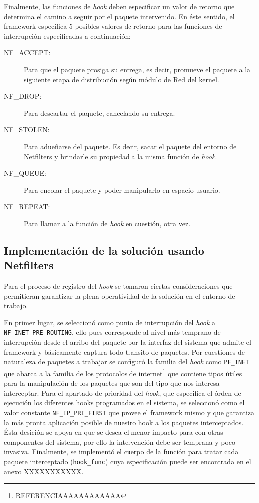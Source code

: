 Finalmente, las funciones de \emph{hook} deben especificar un valor de retorno que determina el camino a seguir por el paquete intervenido. En éste sentido, el framework especifica 5 posibles valores de retorno para las funciones de interrupción especificadas a continuación:
\begin{description}
\item[NF\_ACCEPT:] Para que el paquete prosiga su entrega, es decir, promueve el paquete a la siguiente etapa de distribución según módulo de Red del kernel.
\item[NF\_DROP:] Para descartar el paquete, cancelando su entrega.
\item[NF\_STOLEN:] Para adueñarse del paquete. Es decir, sacar el paquete del entorno de Netfilters y brindarle su propiedad a la misma función de \emph{hook}.
\item[NF\_QUEUE:] Para encolar el paquete y poder manipularlo en espacio usuario.
\item[NF\_REPEAT:] Para llamar a la función de \emph{hook} en cuestión, otra vez.
\end{description}

\subsection{Implementación de la solución usando Netfilters}
Para el proceso de registro del \emph{hook} se tomaron ciertas consideraciones que permitieran garantizar la plena operatividad de la solución en el entorno de trabajo.

En primer lugar, se seleccionó como punto de interrupción del \emph{hook} a \verb=NF_INET_PRE_ROUTING=, ello pues corresponde al nivel más temprano de interrupción desde el arribo del paquete por la interfaz del sistema que admite el framework y básicamente captura todo transito de paquetes. Por cuestiones de naturaleza de paquetes a trabajar se configuró la familia del \emph{hook} como \verb=PF_INET= que abarca a la familia de los protocolos de internet\footnote{REFERENCIAAAAAAAAAAAA} que contiene tipos útiles para la manipulación de los paquetes que son del tipo que nos interesa interceptar. Para el apartado de prioridad del \emph{hook}, que especifica el órden de ejecución los diferentes hooks programados en el sistema, se seleccionó como el valor constante \verb=NF_IP_PRI_FIRST= que provee el framework mismo y que garantiza la más pronta aplicación posible de nuestro hook a los paquetes interceptados. Ésta desición se apoya en que se desea el menor impacto para con otras componentes del sistema, por ello la intervención debe ser temprana y poco invasiva. Finalmente, se implementó el cuerpo de la función para tratar cada paquete interceptado (\verb=hook_func=) cuya especificación puede ser encontrada en el anexo XXXXXXXXXXX.

